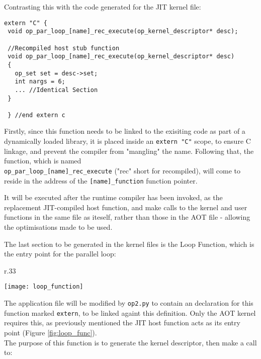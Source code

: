Contrasting this with the code generated for the JIT kernel file:

\begin{lstlisting}[linewidth = \textwidth, framesep=0pt, linebackgroundcolor={\ifnum\value{lstnumber}=9\color{red!20} \else \color{green!20} \fi}]
 extern "C" {
 void op_par_loop_[name]_rec_execute(op_kernel_descriptor* desc);

 //Recompiled host stub function
 void op_par_loop_[name]_rec_execute(op_kernel_descriptor* desc)
 {
   op_set set = desc->set;
   int nargs = 6;
   ... //Identical Section
 }

 } //end extern c
\end{lstlisting}
\vspace{-1em}

Firstly, since this function needs to be linked to the exisiting code as part of a dynamically loaded library, it is placed inside an \verb|extern "C"| scope, to ensure C linkage, and prevent the compiler from "mangling" the name. Following that, the function, which is named\\
\verb|op_par_loop_[name]_rec_execute| ("rec" short for recompiled), will come to reside in the address of the \verb|[name]_function| function pointer.
\par
It will be executed after the runtime compiler has been invoked, as the replacement JIT-compiled host function, and make calls to the kernel and user functions in the same file as iteself, rather than those in the AOT file - allowing the optimisations made to be used.

The last section to be generated in the kernel files is the Loop Function, which is the entry point for the parallel loop:

\begin{wrapfigure}[12]{r}{.33\textwidth}
  \vspace{-3em}
  \centering
  \caption{Loop Function}
  \label{fig:loop_func}
  \texttt{[image: loop\_function]}
\end{wrapfigure}
The application file will be modified by \verb|op2.py| to contain an declaration for this function marked \verb|extern|, to be linked againt this definition. Only the AOT kernel requires this, as previously mentioned the JIT host function acts as its entry point (Figure \ref{fig:loop_func}).
\\
The purpose of this function is to generate the kernel descriptor, then make a call to:

